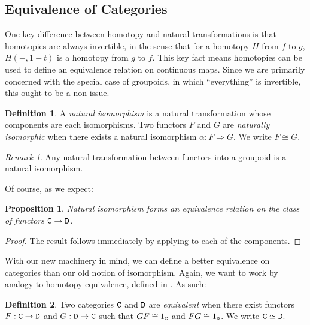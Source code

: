 \documentclass[11 pt]{amsart}
\theoremstyle{plain}   %
\newtheorem{prop}{Proposition}[section]
\theoremstyle{definition}
\newtheorem{defn}{Definition}[section]
\theoremstyle{remark}
\newtheorem{rem}{Remark}[section]
\numberwithin{equation}{section}
\def\nat{\Rightarrow}
\newcommand{\cat}[1]{{\normalfont\texttt{#1}}}
\begin{document}
\subsection{Equivalence of Categories}

One key difference between homotopy and natural transformations is that
homotopies are always invertible, in the sense that for a homotopy $H$ from $f$
to $g$, $H(-, 1-t)$ is a homotopy from $g$ to $f$. This key fact means
homotopies can be used to define an equivalence relation on continuous maps.
Since we are primarily concerned with the special case of groupoids, in which
``everything'' is invertible, this ought to be a non-issue.

\begin{defn}
	A \emph{natural isomorphism} is a natural transformation whose components are
	each isomorphisms. Two functors $F$ and $G$ are \emph{naturally isomorphic}
	when there exists a natural isomorphism $\alpha: F\nat G$. We write $F\cong
		G$.
\end{defn}

\begin{rem}\label{groupoid natural isormorphism}
	Any natural transformation between functors into a groupoid is a natural
	isomorphism.
\end{rem}

Of course, as we expect:

\begin{prop}\label{natural isomorphism is equivalence}
	Natural isomorphism forms an equivalence relation on the class of functors
	$\cat{C}\rightarrow\cat{D}$.
\end{prop}

\begin{proof}
	The result follows immediately by applying 
	to each of the components.
\end{proof}

With our new machinery in mind, we can define a better equivalence on categories
than our old notion of isomorphism. Again, we want to work by analogy to
homotopy equivalence, defined in . As such:

\begin{defn}\label{equivalence of categories}
	Two categories $\cat{C}$ and $\cat{D}$ are \emph{equivalent} when there exist
	functors $F:\cat{C}\rightarrow\cat{D}$ and $G:\cat{D}\rightarrow\cat{C}$ such
	that $GF\cong 1_\cat{C}$ and $FG\cong 1_\cat{D}$. We write
	$\cat{C}\simeq\cat{D}$.
\end{defn}
\end{document}
